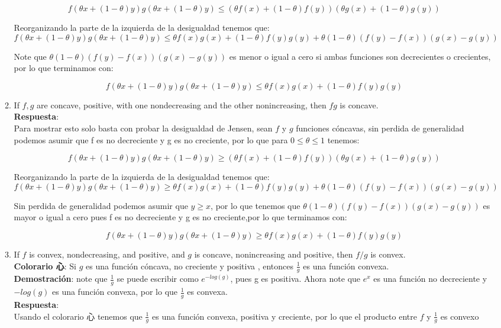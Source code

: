 \documentclass[12pt, oneside]{article}%
\begin{document}
\begin{enumerate}
\begin{enumerate}
    $$f(\theta x +(1-\theta) y) g(\theta x +(1-\theta) y) \leq (\theta f(x) +(1-\theta) f(y))(\theta g(x) +(1-\theta) g(y))$$
    
    Reorganizando la parte de la izquierda de la desigualdad tenemos que:
    $$ f(\theta x +(1-\theta) y) g(\theta x +(1-\theta) y) \leq  \theta f(x)g(x) + (1-\theta)f(y)g(y) + \theta(1-\theta)(f(y)-f(x))(g(x)-g(y))$$ 
    
    Note que $\theta(1-\theta)(f(y)-f(x))(g(x)-g(y))$ es menor o igual a cero si ambas funciones son decrecientes o crecientes, por lo que terminamos con: 

    $$f(\theta x +(1-\theta) y) g(\theta x +(1-\theta) y) \leq  \theta f(x)g(x) + (1-\theta)f(y)g(y) $$
        

    \item If $f,g$ are concave, positive, with one nondecreasing and the other nonincreasing, then $fg$ is concave.\\
     \textbf{Respuesta}: \\
    Para mostrar esto solo basta con probar la desigualdad de Jensen, sean $f$ y $g$ funciones cóncavas, sin perdida de generalidad podemos asumir que  f es no decreciente y g es no creciente, por lo que para $0\leq \theta \leq 1$ tenemos:
    
     $$f(\theta x +(1-\theta) y) g(\theta x +(1-\theta) y) \geq (\theta f(x) +(1-\theta) f(y))(\theta g(x) +(1-\theta) g(y))$$
     
    Reorganizando la parte de la izquierda de la desigualdad tenemos que:
    $$ f(\theta x +(1-\theta) y) g(\theta x +(1-\theta) y) \geq  \theta f(x)g(x) + (1-\theta)f(y)g(y) + \theta(1-\theta)(f(y)-f(x))(g(x)-g(y))$$ 
    
     Sin perdida de generalidad podemos asumir que $y\geq x$, por lo que tenemos que  $\theta(1-\theta)(f(y)-f(x))(g(x)-g(y))$ es mayor o igual a cero pues f es no decreciente y g es no creciente,por lo que terminamos con: 

    $$f(\theta x +(1-\theta) y) g(\theta x +(1-\theta) y) \geq  \theta f(x)g(x) + (1-\theta)f(y)g(y) $$

    
    \item If $f$ is convex, nondecreasing, and positive, and $g$ is concave, nonincreasing and positive, then $f/g$ is convex.\\
   
    \textbf{Colorario 心}: Si $g$ es una función cóncava, no creciente y positiva , entonces $\frac{1}{g}$ es una función convexa.\\
    \textbf{Demostración}: note que $\frac{1}{g}$ se puede escribir como $e^{-log(g)}$, pues g es positiva. Ahora note que $e^x$ es una función no decreciente y $-log(g)$ es una función convexa, por lo que $\frac{1}{g}$ es convexa. \\
    \textbf{Respuesta}: \\
    Usando el colorario 心 tenemos que $\frac{1}{g}$ es una función convexa, positiva y creciente, por lo que el producto entre $f$ y $\frac{1}{g}$ es convexo
    

\end{enumerate}
\end{enumerate}
\end{document}
